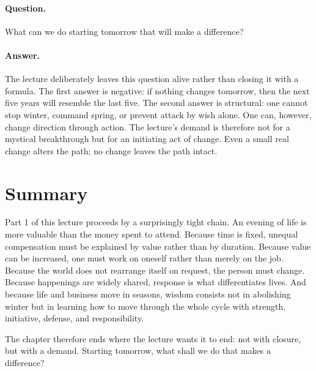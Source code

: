 \paragraph{Question.} What can we do starting tomorrow that will make a difference?

\paragraph{Answer.} The lecture deliberately leaves this question alive rather than closing it with a formula. The first answer is negative: if nothing changes tomorrow, then the next five years will resemble the last five. The second answer is structural: one cannot stop winter, command spring, or prevent attack by wish alone. One can, however, change direction through action. The lecture's demand is therefore not for a mystical breakthrough but for an initiating act of change. Even a small real change alters the path; no change leaves the path intact.

\section{Summary}

Part 1 of this lecture proceeds by a surprisingly tight chain. An evening of life is more valuable than the money spent to attend. Because time is fixed, unequal compensation must be explained by value rather than by duration. Because value can be increased, one must work on oneself rather than merely on the job. Because the world does not rearrange itself on request, the person must change. Because happenings are widely shared, response is what differentiates lives. And because life and business move in seasons, wisdom consists not in abolishing winter but in learning how to move through the whole cycle with strength, initiative, defense, and responsibility.

The chapter therefore ends where the lecture wants it to end: not with closure, but with a demand. Starting tomorrow, what shall we do that makes a difference?